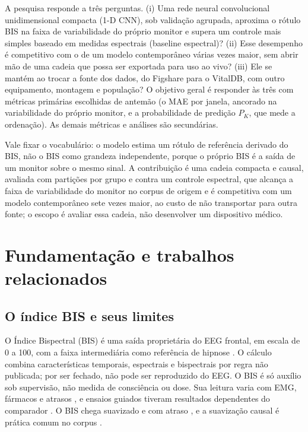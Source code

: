 \documentclass[12pt]{article}
\begin{document}
A pesquisa responde a três perguntas. (i) Uma rede neural convolucional unidimensional compacta (1-D CNN), sob validação agrupada, aproxima o rótulo BIS na faixa de variabilidade do próprio monitor e supera um controle mais simples baseado em medidas espectrais (baseline espectral)? (ii) Esse desempenho é competitivo com o de um modelo contemporâneo várias vezes maior, sem abrir mão de uma cadeia que possa ser exportada para uso ao vivo? (iii) Ele se mantém ao trocar a fonte dos dados, do Figshare para o VitalDB, com outro equipamento, montagem e população? O objetivo geral é responder às três com métricas primárias escolhidas de antemão (o MAE por janela, ancorado na variabilidade do próprio monitor, e a probabilidade de predição $P_K$, que mede a ordenação). As demais métricas e análises são secundárias.

Vale fixar o vocabulário: o modelo estima um rótulo de referência derivado do BIS, não o BIS como grandeza independente, porque o próprio BIS é a saída de um monitor sobre o mesmo sinal. A contribuição é uma cadeia compacta e causal, avaliada com partições por grupo e contra um controle espectral, que alcança a faixa de variabilidade do monitor no corpus de origem e é competitiva com um modelo contemporâneo sete vezes maior, ao custo de não transportar para outra fonte; o escopo é avaliar essa cadeia, não desenvolver um dispositivo médico.





\section{Fundamentação e trabalhos relacionados}

\subsection{O índice BIS e seus limites}

O Índice Bispectral (BIS) é uma saída proprietária do EEG frontal, em escala de 0 a 100, com a faixa intermediária como referência de hipnose \cite{johansen2000}. O cálculo combina características temporais, espectrais e bispectrais por regra não publicada; por ser fechado, não pode ser reproduzido do EEG. O BIS é só auxílio sob supervisão, não medida de consciência ou dose. Sua leitura varia com EMG, fármacos e atrasos \cite{schuller2015,hans2005,pilge2006}, e ensaios guiados tiveram resultados dependentes do comparador \cite{baware,bunaware,bagrecall}. O BIS chega suavizado e com atraso \cite{pilge2006}, e a suavização causal é prática comum no corpus \cite{sukriti2026}.
\end{document}
